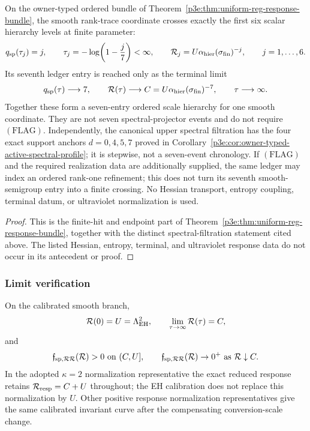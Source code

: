 \documentclass[12pt,a4paper]{article}
\begin{document}
\begin{corollary}
\label{p3:thm:active-window-matching-rule}
On the owner-typed ordered bundle of
Theorem~\ref{p3e:thm:uniform-reg-response-bundle}, the smooth rank-trace
coordinate crosses exactly
the first six scalar hierarchy levels at finite parameter:
\[
 q_{\rm sp}(\tau_j)=j,\qquad
 \tau_j=-\log\!\left(1-\frac j7\right)<\infty,\qquad
 \mathcal R_j=U\alpha_{\rm hier}(\sigma_{\rm fin})^{-j},
 \qquad j=1,\ldots,6.
\]
Its seventh ledger entry is reached only as the terminal limit
\[
 q_{\rm sp}(\tau)\longrightarrow7,\qquad
 \mathcal R(\tau)\longrightarrow
 C=U\alpha_{\rm hier}(\sigma_{\rm fin})^{-7},
 \qquad \tau\longrightarrow\infty.
\]
Together these form a seven-entry ordered scale hierarchy for one smooth
coordinate.  They are not seven spectral-projector events and do not require
\((\mathrm{FLAG})\).  Independently, the canonical upper spectral filtration
has the four exact support anchors \(d=0,4,5,7\) proved in
Corollary~\ref{p3e:cor:owner-typed-active-spectral-profile}; it is stepwise,
not a seven-event chronology.  If
\((\mathrm{FLAG})\) and the required realization data are additionally
supplied, the same ledger may index an ordered rank-one refinement; this does
not turn its seventh smooth-semigroup entry into a finite crossing.
No Hessian transport, entropy coupling, terminal datum, or ultraviolet
normalization is used.
\end{corollary}

\begin{proof}
This is the finite-hit and endpoint part of
Theorem~\ref{p3e:thm:uniform-reg-response-bundle}, together with the distinct
spectral-filtration statement cited above.  The listed Hessian, entropy,
terminal, and ultraviolet response data do not occur in its antecedent or
proof.
\end{proof}

\subsubsection{Limit verification}

\begin{proposition}
\label{p3:prop:uv-limit-active-density}
On the calibrated smooth branch,
\[
 \mathcal R(0)=U=\Lambda_{\rm EH}^2,\qquad
 \lim_{\tau\to\infty}\mathcal R(\tau)=C,
\]
and
\[
 \mathfrak f_{\rm sp,\mathcal R\mathcal R}(\mathcal R)>0\text{ on }(C,U],
 \qquad
 \mathfrak f_{\rm sp,\mathcal R\mathcal R}(\mathcal R)\to0^+
 \text{ as }\mathcal R\downarrow C.
\]
In the adopted \(\kappa=2\) normalization representative the exact reduced
response retains \(\mathcal R_{\rm resp}=C+U\) throughout; the EH calibration
does not replace this normalization by \(U\).  Other positive response
normalization representatives give the same calibrated invariant curve after
the compensating conversion-scale change.
\end{proposition}
\end{document}
